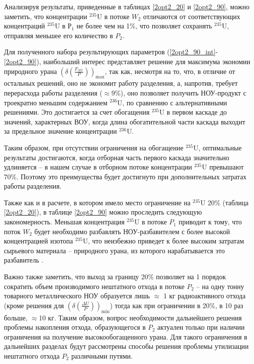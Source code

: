 Анализируя результаты, приведенные в таблицах \ref{2opt2_20} и \ref{2opt2_90}, можно заметить, что концентрации $^{235}$U в потоке $W_2$ отличаются от соответствующих концентраций $^{235}$U в $Р_1$ не более чем на 1\%, что позволяет сохранять $^{235}$U, отправляя меньшее его количество в $P_2$.

Для полученного набора результирующих параметров (\ref{2opt2_90_int}-\ref{2opt2_90}), наибольший интерес представляет решение для максимума экономии природного урана $(\delta(\frac{F_{NU}}{P}))_\text{max}$, так как, несмотря на то, что, в отличие от остальных решений, оно не экономит работу разделения, а, напротив, требует перерасхода работы разделения ($\approx$9\%), оно позволяет получить НОУ-продукт с троекратно меньшим содержанием $^{236}$U, по сравнению с альтернативными решениями. Это достигается за счет обогащения $^{235}$U в первом каскаде до значений, характерных ВОУ, когда длина обогатительной части каскада выходит за предельное значение концентрации $^{236}$U.

Таким образом, при отсутствии ограничения на обогащение $^{235}$U, оптимальные результаты достигаются, когда отборная часть первого каскада значительно удлиняется -- в нашем случае в отборном потоке концентрации $^{235}$U превышают 70\%. Поэтому это преимущества будет достигнуто при дополнительных затратах работы разделения.

Также как и в расчете, в котором имело место ограничение на $^{235}$U 20\% (таблица \ref{2opt2_20}), в таблице \ref{2opt2_90} можно проследить следующую закономерность. Меньшая концентрация $^{235}$U в потоке $P_{1}$ приводит к тому, что поток $W_{2}$ будет необходимо разбавлять НОУ-разбавителем с более высокой концентрацией изотопа $^{235}$U, что неизбежно приведет к более высоким затратам сырьевого материала -- природного урана, из которого нарабатывается это разбавитель .

Важно также заметить, что выход за границу 20\% позволяет на 1 порядок сократить объем производимого нештатного отхода в потоке $P_{2}$ -- на одну тонну товарного металлического НОУ образуется лишь $\approx$ 1 кг радиоактивного отхода (кроме решения для $(\delta(\frac{\Delta U}{P}))_\text{min}$) тогда как при ограничении в 20\%, в 10 раз больше, $\approx$10 кг. Таким образом, вопрос необходимости дальнейшего решения проблемы накопления отхода, образующегося в $P_{2}$ актуален только при наличии ограничения на получение высокообогащенного урана. Для такого ограничения в дальнейших разделах будут рассмотрены способы решения проблемы утилизации нештатного отхода $P_{2}$ различными путями. 



